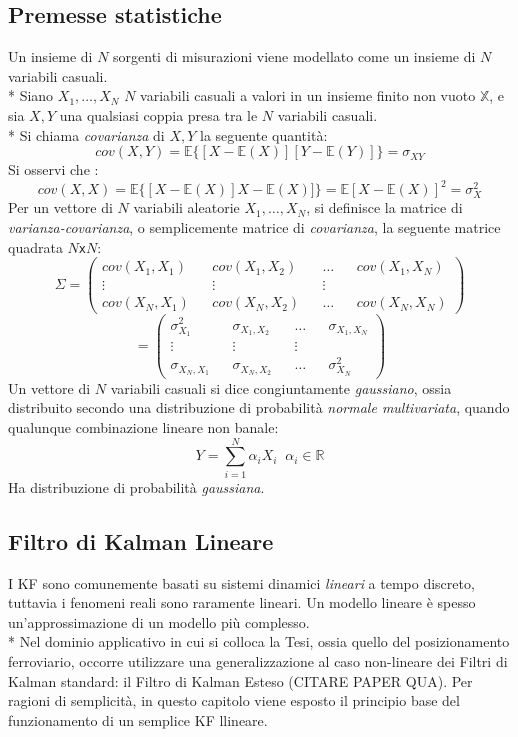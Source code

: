 \subsection{Premesse statistiche}
Un insieme di $N$ sorgenti di misurazioni viene modellato come un insieme di $N$ variabili casuali.\\*
Siano $X_1,\dots,X_N$ $N$ variabili casuali a valori in un insieme finito non vuoto $\mathbb{X}$, e sia $X,Y$ una qualsiasi coppia presa tra le $N$ variabili casuali.\\*
Si chiama \emph{covarianza} di $X,Y$ la seguente quantit\`a:
$$
cov(X,Y) = \mathbb{E}\{[X-\mathbb{E}(X)][Y-\mathbb{E}(Y)]\}= \sigma_{XY}
$$
Si osservi che :
$$
cov(X,X) =  \mathbb{E}\{[X-\mathbb{E}(X)]X-\mathbb{E}(X)]\} = \mathbb{E}[X-\mathbb{E}(X)]^2 =\sigma^2_{X}
$$
Per un vettore di $N$ variabili aleatorie $X_1,\dots,X_N$, si definisce la matrice di \emph{varianza-covarianza}, o semplicemente matrice di \emph{covarianza}, la seguente matrice quadrata $N$\texttt{x}$N$:
$$
\Sigma = \left(\begin{matrix}
cov(X_1,X_1) && cov(X_1,X_2) && \dots && cov(X_1,X_N) \\
\vdots && \vdots && \vdots \\
cov(X_N,X_1) && cov(X_N, X_2) && \dots && cov(X_N,X_N)
\end{matrix}\right) 
$$
$$
 = \left(\begin{matrix}
\sigma^2_{X_1} && \sigma_{X_1,X_2} && \dots && \sigma_{X_1,X_N} \\
\vdots && \vdots && \vdots \\
\sigma_{X_N,X_1} && \sigma_{X_N, X_2} && \dots && \sigma^2_{X_N}
\end{matrix}\right)
$$
Un vettore di $N$ variabili casuali si dice congiuntamente \emph{gaussiano}, ossia distribuito secondo una distribuzione di probabilit\`a \emph{normale multivariata}, quando qualunque combinazione lineare non banale:
$$
Y = \sum_{i=1}^N \alpha_iX_i\;\;\alpha_i \in \mathbb{R}
$$
Ha distribuzione di probabilit\`a \emph{gaussiana}.
\subsection{Filtro di Kalman Lineare}
I KF sono comunemente basati su sistemi dinamici \emph{lineari} a tempo discreto, tuttavia i fenomeni reali sono raramente lineari. Un modello lineare \`e spesso un'approssimazione di un modello pi\`u complesso.\\*
Nel dominio applicativo in cui si colloca la Tesi, ossia quello del posizionamento ferroviario, occorre utilizzare una generalizzazione al caso non-lineare dei Filtri di Kalman standard: il Filtro di Kalman Esteso (CITARE PAPER QUA). Per ragioni di semplicit\`a, in questo capitolo viene esposto il principio base del funzionamento di un semplice KF llineare.
